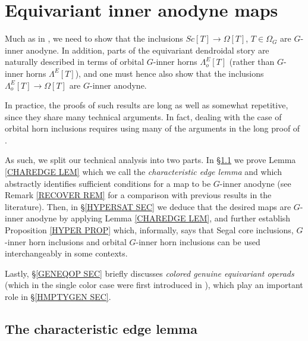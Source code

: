 \documentclass[a4paper,10pt
]{article}%
\begin{document}
\section{Equivariant inner anodyne maps}\label{EQINNERAN SEC}

Much as in \cite[\S 2]{CM13a}, 
we need to show that the inclusions $Sc[T] \to \Omega[T]$, $T\in \Omega_G$ are $G$-inner anodyne.
In addition, parts of the equivariant dendroidal story are 
naturally described in terms of 
orbital $G$-inner horns $\Lambda^E_o[T]$ 
(rather than $G$-inner horns $\Lambda^E[T]$),
and one must hence also show that the inclusions
$\Lambda^E_o[T] \to \Omega[T]$
are $G$-inner anodyne.

In practice, the proofs of such results are long as well as somewhat repetitive, since they share many technical arguments.
In fact, dealing with the case of orbital horn inclusions requires using many of the arguments in the long proof of \cite[Thm 7.1]{Per17}.

As such, we split our technical analysis into two parts.
In \S \ref{CHAREDGE SEC} we prove Lemma \ref{CHAREDGE LEM} which  we call the \textit{characteristic edge lemma} and
which abstractly identifies sufficient conditions for a map to be $G$-inner anodyne
(see Remark \ref{RECOVER REM} for a comparison with previous results in the literature).
Then, in \S \ref{HYPERSAT SEC} we deduce that the desired maps
are $G$-inner anodyne by applying Lemma \ref{CHAREDGE LEM},
and further establish Proposition \ref{HYPER PROP} which,
informally,
says that Segal core inclusions, $G$-inner horn inclusions and orbital $G$-inner horn inclusions can be used interchangeably in some contexts.


Lastly, \S \ref{GENEQOP SEC} briefly discusses \textit{colored genuine equivariant operads}
(which in the single color case were first introduced in \cite{BP17}), which play an important role in \S \ref{HMPTYGEN SEC}.


\subsection{The characteristic edge lemma} \label{CHAREDGE SEC}
\end{document}
